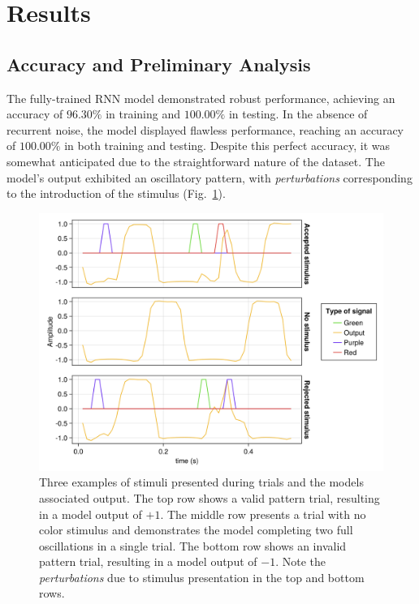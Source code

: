 \documentclass[conference]{IEEEtran}
\begin{document}
\section{Results}

\subsection{Accuracy and Preliminary Analysis}

The fully-trained RNN model demonstrated robust performance, achieving an accuracy of $96.30\%$ in training and $100.00\%$ in testing. In the absence of recurrent noise, the model displayed flawless performance, reaching an accuracy of $100.00\%$ in both training and testing. Despite this perfect accuracy, it was somewhat anticipated due to the straightforward nature of the dataset. The model's output exhibited an oscillatory pattern, with \textit{perturbations} corresponding to the introduction of the stimulus (Fig.~\ref{exampletrialstimuli}).

\begin{figure}[htbp]
\centerline{\includegraphics[scale=0.10]{SET_examples.png}}
\caption{Three examples of stimuli presented during trials and the models associated output. The top row shows a valid pattern trial, resulting in a model output of $+1$. The middle row presents a trial with no color stimulus and demonstrates the model completing two full oscillations in a single trial. The bottom row shows an invalid pattern trial, resulting in a model output of $-1$. Note the \textit{perturbations} due to stimulus presentation in the top and bottom rows.}
\label{exampletrialstimuli}
\end{figure}
\end{document}
